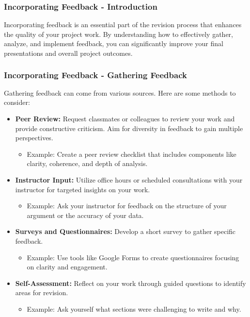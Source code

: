 \documentclass[aspectratio=169]{beamer}
\begin{document}
\begin{frame}[fragile]
    \frametitle{Incorporating Feedback - Introduction}
    Incorporating feedback is an essential part of the revision process that enhances the quality of your project work. By understanding how to effectively gather, analyze, and implement feedback, you can significantly improve your final presentations and overall project outcomes.
\end{frame}

\begin{frame}[fragile]
    \frametitle{Incorporating Feedback - Gathering Feedback}
    Gathering feedback can come from various sources. Here are some methods to consider:

    \begin{itemize}
        \item \textbf{Peer Review:} Request classmates or colleagues to review your work and provide constructive criticism. Aim for diversity in feedback to gain multiple perspectives.
        \begin{itemize}
            \item Example: Create a peer review checklist that includes components like clarity, coherence, and depth of analysis.
        \end{itemize}
        
        \item \textbf{Instructor Input:} Utilize office hours or scheduled consultations with your instructor for targeted insights on your work.
        \begin{itemize}
            \item Example: Ask your instructor for feedback on the structure of your argument or the accuracy of your data.
        \end{itemize}
        
        \item \textbf{Surveys and Questionnaires:} Develop a short survey to gather specific feedback.
        \begin{itemize}
            \item Example: Use tools like Google Forms to create questionnaires focusing on clarity and engagement.
        \end{itemize}
        
        \item \textbf{Self-Assessment:} Reflect on your work through guided questions to identify areas for revision.
        \begin{itemize}
            \item Example: Ask yourself what sections were challenging to write and why.
        \end{itemize}
    \end{itemize}
\end{frame}
\end{document}
